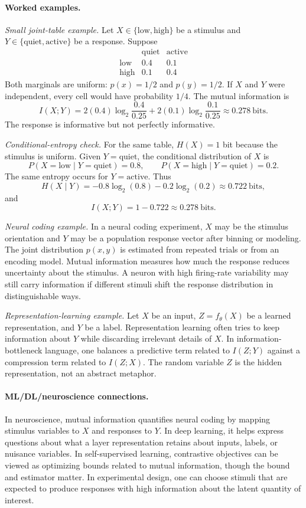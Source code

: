 \paragraph{Worked examples.}
\emph{Small joint-table example.}
Let \(X\in\{\text{low},\text{high}\}\) be a stimulus and \(Y\in\{\text{quiet},\text{active}\}\) be a response. Suppose
\[
\begin{array}{c|cc}
 & \text{quiet} & \text{active}\\
\hline
\text{low} & 0.4 & 0.1\\
\text{high} & 0.1 & 0.4
\end{array}
\]
Both marginals are uniform: \(p(x)=1/2\) and \(p(y)=1/2\). If \(X\) and \(Y\) were independent, every cell would have probability \(1/4\). The mutual information is
\[
I(X;Y)
=2(0.4)\log_2\frac{0.4}{0.25}
+2(0.1)\log_2\frac{0.1}{0.25}
\approx 0.278\ \text{bits}.
\]
The response is informative but not perfectly informative.

\emph{Conditional-entropy check.}
For the same table, \(H(X)=1\) bit because the stimulus is uniform. Given \(Y=\text{quiet}\), the conditional distribution of \(X\) is
\[
P(X=\text{low}\mid Y=\text{quiet})=0.8,\qquad
P(X=\text{high}\mid Y=\text{quiet})=0.2.
\]
The same entropy occurs for \(Y=\text{active}\). Thus
\[
H(X\mid Y)
=-0.8\log_2(0.8)-0.2\log_2(0.2)
\approx 0.722\ \text{bits},
\]
and
\[
I(X;Y)=1-0.722\approx 0.278\ \text{bits}.
\]

\emph{Neural coding example.}
In a neural coding experiment, \(X\) may be the stimulus orientation and \(Y\) may be a population response vector after binning or modeling. The joint distribution \(p(x,y)\) is estimated from repeated trials or from an encoding model. Mutual information measures how much the response reduces uncertainty about the stimulus. A neuron with high firing-rate variability may still carry information if different stimuli shift the response distribution in distinguishable ways.

\emph{Representation-learning example.}
Let \(X\) be an input, \(Z=f_\theta(X)\) be a learned representation, and \(Y\) be a label. Representation learning often tries to keep information about \(Y\) while discarding irrelevant details of \(X\). In information-bottleneck language, one balances a predictive term related to \(I(Z;Y)\) against a compression term related to \(I(Z;X)\). The random variable \(Z\) is the hidden representation, not an abstract metaphor.

\paragraph{ML/DL/neuroscience connections.}
In neuroscience, mutual information quantifies neural coding by mapping stimulus variables to \(X\) and responses to \(Y\). In deep learning, it helps express questions about what a layer representation retains about inputs, labels, or nuisance variables. In self-supervised learning, contrastive objectives can be viewed as optimizing bounds related to mutual information, though the bound and estimator matter. In experimental design, one can choose stimuli that are expected to produce responses with high information about the latent quantity of interest.

